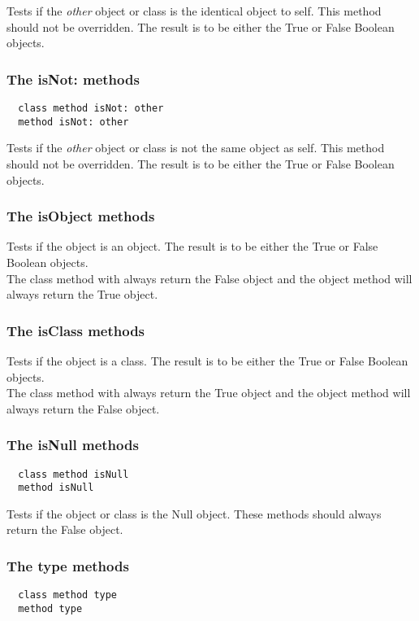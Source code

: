 Tests if the \textit{other} object or class is the identical object
to self. This method should not be overridden. The result is to be either the
True or False Boolean objects.

\hfill
\subsubsection {The isNot: methods}
\begin{lstlisting}
  class method isNot: other
  method isNot: other
\end{lstlisting}

Tests if the \textit{other} object or class is not the same object
as self. This method should not be overridden. The result is to be either the
True or False Boolean objects.

\hfill
\subsubsection {The isObject methods}

Tests if the object is an object. The result is to be either the
True or False Boolean objects.\\

The class method with always return the False object and the object method will
always return the True object.

\hfill
\subsubsection {The isClass methods}

Tests if the object is a class. The result is to be either the
True or False Boolean objects.\\

The class method with always return the True object and the object method will
always return the False object.

\hfill
\subsubsection {The isNull methods}
\begin{lstlisting}
  class method isNull
  method isNull
\end{lstlisting}

Tests if the object or class is the Null object. These methods should always
return the False object.

\hfill
\subsubsection {The type methods}
\begin{lstlisting}
  class method type
  method type
\end{lstlisting}

